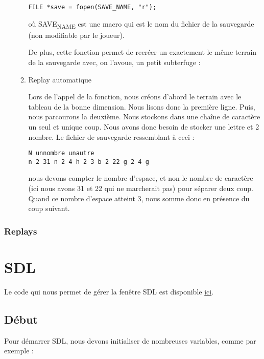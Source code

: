 \documentclass[letter]{article}
\begin{document}
\begin{enumerate}
\begin{enumerate}
\begin{verbatim}
FILE *save = fopen(SAVE_NAME, "r");
\end{verbatim}

où SAVE\textsubscript{NAME} est une macro qui est le nom du fichier de la sauvegarde (non modifiable par le joueur).

De plus, cette fonction permet de recréer un exactement le même terrain de la sauvegarde avec, on l'avoue, un petit subterfuge :



\item Replay automatique
\label{sec:org0afd7c8}

Lors de l'appel de la fonction, nous créons d'abord le terrain avec le tableau de la bonne dimension. Nous lisons donc la première ligne.
Puis, nous parcourons la deuxième. Nous stockons dans une chaîne de caractère un seul et unique coup. Nous avons donc besoin de stocker une lettre et 2 nombre.
Le fichier de sauvegarde ressemblant à ceci :

\begin{verbatim}
N unnombre unautre
n 2 31 n 2 4 h 2 3 b 2 22 g 2 4 g 
\end{verbatim}

nous devons compter le nombre d'espace, et non le nombre de caractère (ici nous avons 31 et 22 qui ne marcherait pas) pour séparer deux coup. Quand ce nombre d'espace atteint 3, nous somme donc en présence du coup suivant.
\end{enumerate}
\end{enumerate}


\subsubsection{Replays}
\label{sec:orgbcb4959}



\section{SDL}
\label{sec:orgfc5bbfc}

Le code qui nous permet de gérer la fenêtre SDL est disponible \href{render.c}{ici}.

\subsection{Début}
\label{sec:org3c0b1e5}

Pour démarrer SDL, nous devons initialiser de nombreuses variables, comme par exemple :
\end{document}
